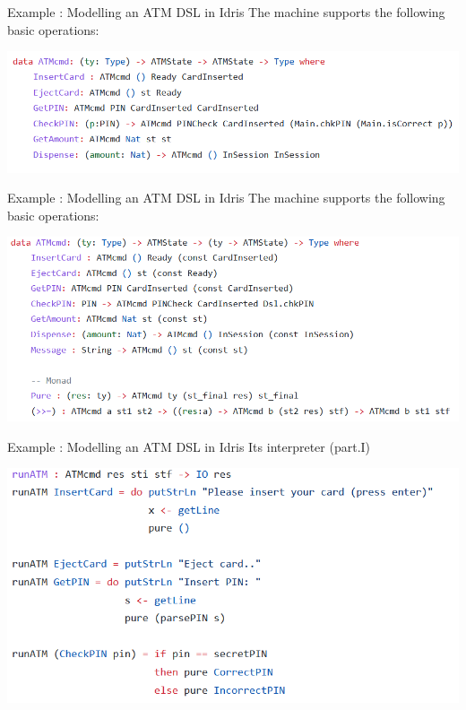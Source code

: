 \documentclass{beamer}
\newcommand{\dsltitle}{Example : Modelling an ATM DSL in Idris}
\begin{document}
	\begin{frame}[fragile]{\dsltitle}
		The machine supports the following basic operations:
		\begin{center}
			\includegraphics[width=\textwidth]{pics/dsl-code-2}
		\end{center}
	\end{frame}
	
	\begin{frame}[fragile]{\dsltitle}
		The machine supports the following basic operations:
		\begin{center}
			\includegraphics[width=\textwidth]{pics/dsl-code-3}
		\end{center}
	\end{frame}
	
	\begin{frame}[fragile]{\dsltitle}
		Its interpreter (part.I)
		\begin{center}
			\includegraphics[width=\textwidth]{pics/dsl-code-4_1}
		\end{center}
	\end{frame}
	
\end{document}

